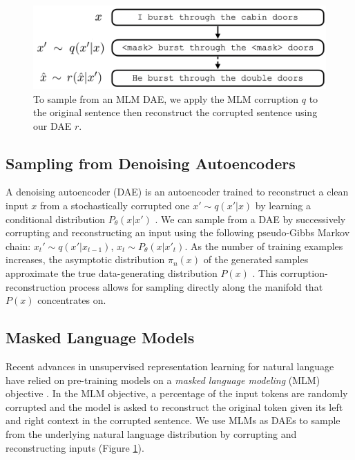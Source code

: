 \begin{figure}[t!]
\centering
\includegraphics[scale=0.21]{img/bert_dae.png}
\caption{To sample from an MLM DAE, we apply the MLM corruption $q$ to the original sentence then reconstruct the corrupted sentence using our DAE $r$.}
\label{fig:dae_sampling}
\end{figure}

\subsection{Sampling from Denoising Autoencoders}
A denoising autoencoder (DAE) is an autoencoder trained to reconstruct a clean input $x$ from a stochastically corrupted one $x'\sim q(x'|x)$ by learning a conditional distribution $P_\theta (x| x')$ \citep{vincent2008extracting}.
We can sample from a DAE by successively corrupting and reconstructing an input using the following pseudo-Gibbs Markov chain: $x_t' \sim q(x'|x_{t-1})$, $x_t \sim P_\theta(x|x'_t).$
As the number of training examples increases, the asymptotic distribution $\pi_n(x)$ of the generated samples approximate the true data-generating distribution $P(x)$ \citep{bengio2013generalized}.
This corruption-reconstruction process allows for sampling directly along the manifold that $P(x)$ concentrates on.

\subsection{Masked Language Models}
Recent advances in unsupervised representation learning for natural language have relied on pre-training models on a \textit{masked language modeling} (MLM) objective \citep{devlin2018, liu2019roberta}.
In the MLM objective, a percentage of the input tokens are randomly corrupted and the model is asked to reconstruct the original token given its left and right context in the corrupted sentence.
We use MLMs as DAEs \citep{lewis2019bart} to sample from the underlying natural language distribution by corrupting and reconstructing inputs (Figure \ref{fig:dae_sampling}).
